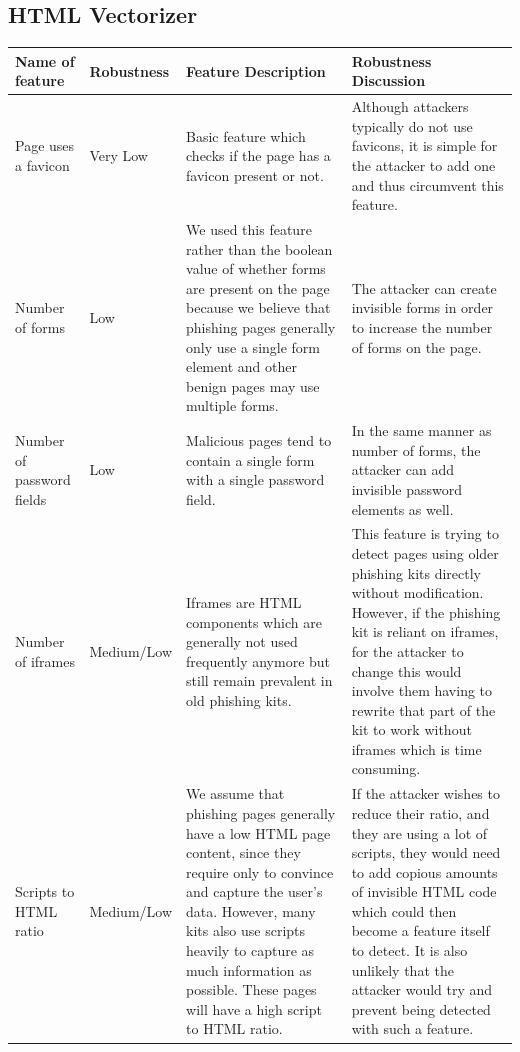 \documentclass[12pt,twoside]{report}
\begin{document}
\subsection{HTML Vectorizer}\label{htmlvectorizer}
\begin{center}
\begin{longtable}{ |>{\raggedright\arraybackslash}p{}|>{\raggedright\arraybackslash}p{}|>{\raggedright\arraybackslash}p{}|>{\raggedright\arraybackslash}p{}| } 
\hline
\textbf{Name of feature} & \textbf{Robustness} & \textbf{Feature Description} & \textbf{Robustness Discussion} \\
\hline
\endhead
Page uses a favicon & Very Low & Basic feature which checks if the page has a favicon present or not.  & Although attackers typically do not use favicons, it is simple for the attacker to add one and thus circumvent this feature.\\
\hline
Number of forms & Low & We used this feature rather than the boolean value of whether forms are present on the page because we believe that phishing pages generally only use a single form element and other benign pages may use multiple forms. & The attacker can create invisible forms in order to increase the number of forms on the page.  \\
\hline
Number of password fields & Low & Malicious pages tend to contain a single form with a single password field. & In the same manner as number of forms, the attacker can add invisible password elements as well.\\
\hline
Number of iframes & Medium/Low & Iframes are HTML components which are generally not used frequently anymore but still remain prevalent in old phishing kits. & This feature is trying to detect pages using older phishing kits directly without modification. However, if the phishing kit is reliant on iframes, for the attacker to change this would involve them having to rewrite that part of the kit to work without iframes which is time consuming.\\
\hline
Scripts to HTML ratio & Medium/Low& We assume that phishing pages generally have a low HTML page content, since they require only to convince and capture the user's data. However, many kits also use scripts heavily to capture as much information as possible. These pages will have a high script to HTML ratio. & If the attacker wishes to reduce their ratio, and they are using a lot of scripts, they would need to add copious amounts of invisible HTML code which could then become a feature itself to detect. It is also unlikely that the attacker would try and prevent being detected with such a feature. \\

\end{longtable}
\end{center}
\end{document}
